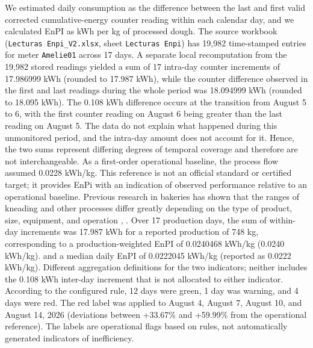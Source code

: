 \documentclass[technologies,article,submit,pdftex,moreauthors]{Definitions/mdpi}
\begin{document}
We estimated daily consumption as the difference between the last and first valid corrected cumulative-energy counter reading within each calendar day, and we calculated EnPI as kWh per kg of processed dough. The source workbook (\texttt{Lecturas Enpi\_V2.xlsx}, sheet \texttt{Lecturas Enpi}) has 19,982 time-stamped entries for meter \texttt{Amelie01} across 17 days. A separate local recomputation from the 19,982 stored readings yielded a sum of 17 intra-day counter increments of 17.986999 kWh (rounded to 17.987 kWh), while the counter difference observed in the first and last readings during the whole period was 18.094999 kWh (rounded to 18.095 kWh). The 0.108 kWh difference occurs at the transition from August 5 to 6, with the first counter reading on August 6 being greater than the last reading on August 5. The data do not explain what happened during this unmonitored period, and the intra-day amount does not account for it. Hence, the two sums represent differing
degrees of temporal coverage and therefore are not interchangeable. As a first-order operational baseline, the process flow assumed 0.0228 kWh/kg. This reference is not an official standard or certified target; it provides EnPi with an indication of observed performance relative to an operational baseline. Previous research in bakeries has shown that the ranges of kneading and other processes differ greatly depending on the type of product, size, equipment, and operation \cite{ref22}, \cite{ref23}. Over 17 production days, the sum of within-day increments was 17.987 kWh for a reported production of 748 kg, corresponding to a production-weighted EnPI of 0.0240468 kWh/kg (0.0240 kWh/kg). and a median daily EnPI of 0.0222045 kWh/kg (reported as 0.0222 kWh/kg). Different aggregation definitions for the two indicators; neither includes the 0.108 kWh inter-day increment that is not allocated to either indicator. According to the configured rule, 12 days were green, 1 day was warning, and 4 days were red. The red label was applied to August 4, August 7, August 10, and August 14, 2026 (deviations between +33.67\% and +59.99\% from the operational reference). The labels are operational flags based on rules, not automatically generated indicators of inefficiency. 
\end{document}
